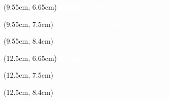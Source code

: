 \documentclass[aspectratio=3219]{beamer}
\begin{document}
{\begin{frame}
\begin{textblock*}{2.95cm}(9.55cm, 6.65cm)
    \centering
    \textcolor{white}{\tiny \bf Εύφυμος Μνεία\\}
\end{textblock*}

\begin{textblock*}{2.95cm}(9.55cm, 7.5cm)
    \centering
    \textcolor{white}{\scriptsize ΤΟΜΑΡΑΣ ΑΛΕΞΑΝΔΡΟΣ \\}
\end{textblock*}

\begin{textblock*}{2.95cm}(9.55cm, 8.4cm)
    \centering
    \textcolor{white}{\tiny \it Ινδία \\}
\end{textblock*}

\begin{textblock*}{2.95cm}(12.5cm, 6.65cm)
    \centering
    \textcolor{white}{\tiny \bf Εύφυμος Μνεία\\}
\end{textblock*}

\begin{textblock*}{2.95cm}(12.5cm, 7.5cm)
    \centering
    \textcolor{white}{\scriptsize ΧΑΛΑΝΤΖΟΥΚΑΣ ΓΕΡΑΣΙΜΟΣ \\}
\end{textblock*}

\begin{textblock*}{2.95cm}(12.5cm, 8.4cm)
    \centering
    \textcolor{white}{\tiny \it Ολλανδία \\}
\end{textblock*}

\end{frame}
}
\end{document}
